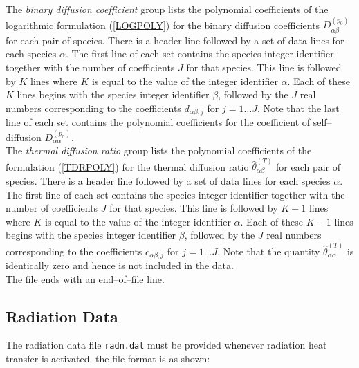\documentclass[dvips]{article}
\begin{document}
\noindent
The {\it binary diffusion coefficient} group lists the polynomial coefficients
of the logarithmic formulation (\ref{LOGPOLY}) for the binary diffusion
coefficients $D_{\alpha\beta}^{(p_{0})}$ for each pair of species.
There is a header line followed by a set of data lines for each species
$\alpha$.  The first line of each set contains the species integer identifier
together with the number of coefficients $J$ for that species.  This line is
followed by $K$ lines where $K$ is equal to the value of the integer
identifier $\alpha$.  Each of these $K$ lines begins with the species integer
identifier $\beta$, followed by the $J$ real numbers corresponding to the
coefficients $d_{\alpha\beta,j}$ for $j=1\ldots J$.  Note that the last line
of each set contains the polynomial coefficients for the coefficient of
self--diffusion $D_{\alpha\alpha}^{(p_{0})}$.\\  

\noindent
The {\it thermal diffusion ratio} group lists the polynomial coefficients
of the formulation (\ref{TDRPOLY}) for the thermal diffusion
ratio $\hat{\theta}_{\alpha\beta}^{(T)}$ for each pair of species.
There is a header line followed by a set of data lines for each species
$\alpha$.  The first line of each set contains the species integer identifier
together with the number of coefficients $J$ for that species.  This line is
followed by $K-1$ lines where $K$ is equal to the value of the integer
identifier $\alpha$.  Each of these $K-1$ lines begins with the species integer
identifier $\beta$, followed by the $J$ real numbers corresponding to the
coefficients $c_{\alpha\beta,j}$ for $j=1\ldots J$.  Note that the quantity
$\hat{\theta}_{\alpha\alpha}^{(T)}$ is identically zero and hence is not
included in the data.\\  

\noindent
The file ends with an end--of--file line.

\subsection{Radiation Data}
The radiation data file {\tt radn.dat} must be provided whenever
radiation heat transfer is activated.  the file format is as shown:
\end{document}
